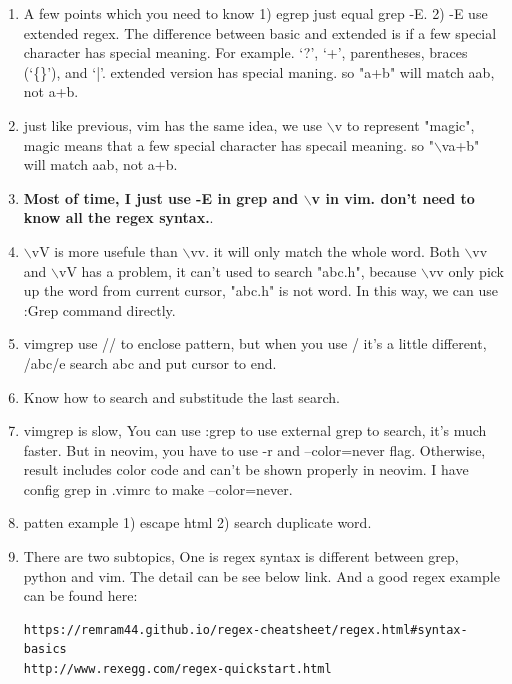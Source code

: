 \documentclass[a4paper,11pt,twoside]{book}
\begin{document}
\begin{itemize}
\begin{enumerate}
            \item A few points which you need to know 1) egrep just equal grep -E. 2) -E use extended regex. The difference between basic and extended is if a few special character has special meaning. For example. ‘?’, ‘+’, parentheses, braces (‘\{\}’), and ‘|’. extended version has special maning. so "a+b" will match aab, not a+b.  

            \item just like previous, vim has the same idea, we use $\backslash$v to represent "magic", magic means that a few special character has specail meaning.  so "$\backslash$va+b" will match aab, not a+b. 

            \item \textbf{Most of time, I just use -E in grep and $\backslash$v in vim. don't need to know all the regex syntax.}.

            \item $\backslash$vV is more usefule than $\backslash$vv. it will only match the whole word.  Both $\backslash$vv and $\backslash$vV has a problem, it can't used to search "abc.h", because $\backslash$vv only pick up the word from current cursor, "abc.h" is not word. In this way, we can use :Grep command directly.

				\item vimgrep use // to enclose pattern, but when you use / it's a little different, /abc/e search abc and put cursor to end.
                \item Know how to search and substitude the last search. 
                    
                \item vimgrep is slow, You can use :grep to use external grep to search, it's much faster. But in neovim, you have to use -r and --color=never flag. Otherwise, result includes color code and can't be shown properly in neovim. I have config grep in .vimrc to make --color=never. 

				\item patten example 1) escape html 2) search duplicate word. 

				\item There are two subtopics, One is regex syntax is different between grep, python and vim. The detail can be see below link.  And a good regex example can be found here:
\begin{verbatim}
https://remram44.github.io/regex-cheatsheet/regex.html#syntax-basics 
http://www.rexegg.com/regex-quickstart.html
\end{verbatim}	
		\end{enumerate}


\end{itemize}
\end{document}
